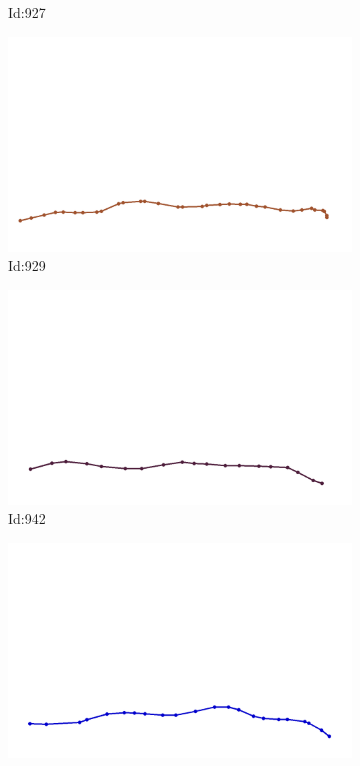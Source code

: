 \documentclass[12pt,twoside]{report}
\begin{document}
\begin{figure}
\begin{subfigure}[b]{0.20\textwidth}
\caption{Id:927}
\end{subfigure}
\begin{subfigure}[b]{0.20\textwidth}
\centering
\includegraphics[width=\textwidth]{../trajectories/929.png}
\caption{Id:929}
\end{subfigure}
\begin{subfigure}[b]{0.20\textwidth}
\centering
\includegraphics[width=\textwidth]{../trajectories/942.png}
\caption{Id:942}
\end{subfigure}
\begin{subfigure}[b]{0.20\textwidth}
\centering
\includegraphics[width=\textwidth]{../trajectories/945.png}

\end{subfigure}
\end{figure}
\end{document}
